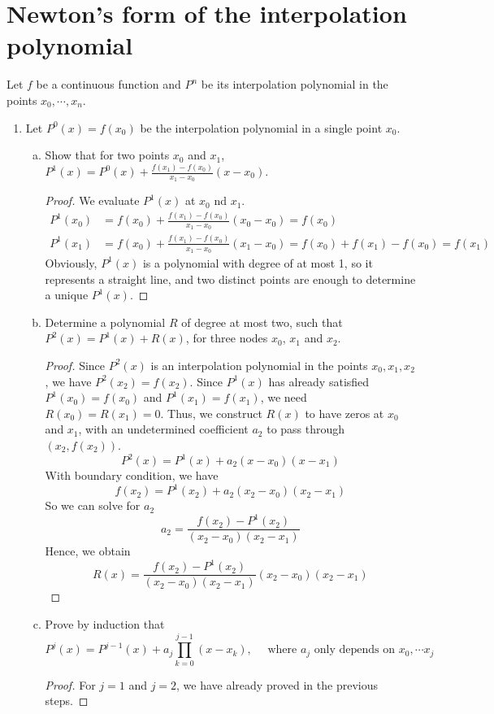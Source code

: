 \section{Newton's form of the interpolation polynomial}
Let $f$ be a continuous function and $P^n$ be its interpolation polynomial in the points \(x_0,\cdots,x_n\).
\begin{enumerate}
	\item Let \(P^0(x)=f(x_0)\) be the interpolation polynomial in a single point $x_0$.
	\begin{enumerate}[(a)]
		\item Show that for two points $x_0$ and $x_1$, \(P^1(x)=P^0(x)+\frac{f(x_1)-f(x_0)}{x_1-x_0}(x-x_0)\).
		\begin{proof}
		We evaluate \(P^1(x)\) at $x_0$ nd $x_1$.
		\begin{align*}
		P^1(x_0)&=f(x_0)+\frac{f(x_1)-f(x_0)}{x_1-x_0}(x_0-x_0)=f(x_0)\\
		P^1(x_1)&=f(x_0)+\frac{f(x_1)-f(x_0)}{x_1-x_0}(x_1-x_0)=f(x_0)+f(x_1)-f(x_0)=f(x_1)
		\end{align*}
		Obviously, \(P^1(x)\) is a polynomial with degree of at most 1, so it represents a straight line, and two distinct points are enough to determine a unique \(P^1(x)\).
		\end{proof}
		\item Determine a polynomial $R$ of degree at most two, such that \( P^2(x)=P^1(x)+R(x) \), for three nodes $x_0$, $x_1$ and $x_2$.
		\begin{proof}
		Since \(P^2(x)\) is an interpolation polynomial in the points \(x_0,x_1,x_2\), we have \(P^2(x_2)=f(x_2)\).
		Since \(P^1(x)\) has already satisfied \(P^1(x_0)=f(x_0)\) and \(P^1(x_1)=f(x_1)\), we need \(R(x_0)=R(x_1)=0\).
		Thus, we construct \(R(x)\) to have zeros at $x_0$ and $x_1$, with an undetermined coefficient $a_2$ to pass through \((x_2,f(x_2))\).
		\[ P^2(x)=P^1(x)+a_2(x-x_0)(x-x_1) \]
		With boundary condition, we have
		\[ f(x_2)=P^1(x_2)+a_2(x_2-x_0)(x_2-x_1) \]
		So we can solve for $a_2$
		\[ a_2=\frac{f(x_2)-P^1(x_2)}{(x_2-x_0)(x_2-x_1)} \]
		Hence, we obtain
		\[ R(x)=\frac{f(x_2)-P^1(x_2)}{(x_2-x_0)(x_2-x_1)}(x_2-x_0)(x_2-x_1) \]
		\end{proof}
		\item Prove by induction that
		\[ P^j(x)=P^{j-1}(x)+a_j\prod_{k=0}^{j-1}(x-x_k), \quad \textrm{ where } a_j \textrm{ only depends on } x_0,\cdots x_j \]
		\begin{proof}
		For \(j=1\) and \(j=2\), we have already proved in the previous steps.

\end{proof}
\end{enumerate}
\end{enumerate}
